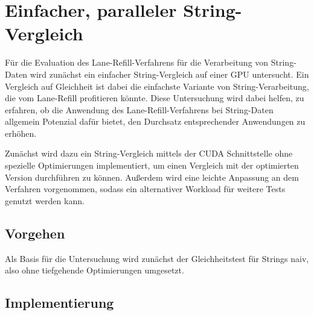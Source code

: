 \chapter{Einfacher, paralleler String-Vergleich}

Für die Evaluation des Lane-Refill-Verfahrens für die Verarbeitung von String-Daten wird zunächst ein einfacher String-Vergleich auf einer GPU untersucht.
Ein Vergleich auf Gleichheit ist dabei die einfachste Variante von String-Verarbeitung, die vom Lane-Refill profitieren könnte.
Diese Untersuchung wird dabei helfen, zu erfahren, ob die Anwendung des Lane-Refill-Verfahrens bei String-Daten allgemein Potenzial dafür bietet, den Durchsatz entsprechender Anwendungen zu erhöhen.

Zunächst wird dazu ein String-Vergleich mittels der CUDA Schnittstelle ohne spezielle Optimierungen implementiert, um einen Vergleich mit der optimierten Version durchführen zu können.
Außerdem wird eine leichte Anpassung an dem Verfahren vorgenommen, sodass ein alternativer Workload für weitere Tests genutzt werden kann.

\section{Vorgehen}

Als Basis für die Untersuchung wird zunächst der Gleichheitstest für Strings naiv, also ohne tiefgehende Optimierungen umgesetzt.


\section{Implementierung}

\newpage

